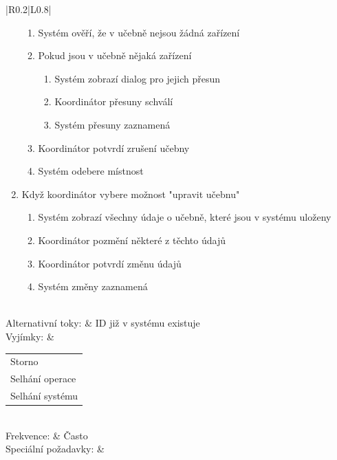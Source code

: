 \documentclass[a4paper,11pt]{article}
\begin{document}
\begin{table}[]
\begin{tabular}{|R{0.2\textwidth}|L{0.8\textwidth}|}
\begin{minipage}[t]{\linewidth}
\begin{enumerate}[nosep, after=\strut, leftmargin=20pt]
\begin{enumerate}[nosep, after=\strut, leftmargin=20pt]
			    \item Systém ověří, že v učebně nejsou žádná zařízení
			    \item Pokud jsou v učebně nějaká zařízení
				\begin{enumerate}[nosep, after=\strut, leftmargin=20pt]
				    \item Systém zobrazí dialog pro jejich přesun
				    \item Koordinátor přesuny schválí
				    \item Systém přesuny zaznamená
				\end{enumerate}
			    \item Koordinátor potvrdí zrušení učebny
			    \item Systém odebere místnost
			\end{enumerate}
		    \item Když koordinátor vybere možnost "upravit učebnu"
			\begin{enumerate}[nosep, after=\strut, leftmargin=20pt]
			    \item Systém zobrazí všechny údaje o učebně, které jsou v systému uloženy
			    \item Koordinátor pozmění některé z těchto údajů
			    \item Koordinátor potvrdí změnu údajů
			    \item Systém změny zaznamená
			\end{enumerate}
		\end{enumerate} 
	    \end{minipage} \\ \hline
	    Alternativní toky: & ID již v systému existuje\\ \hline
	    Vyjímky: & \begin{tabular}[c]{@{}l@{}}Storno\\ Selhání operace\\ Selhání systému\end{tabular} \\ \hline
		Frekvence: & Často \\ \hline
	    Speciální požadavky: & \\ \hline
	\end{tabular}
    \end{table}
\end{document}
